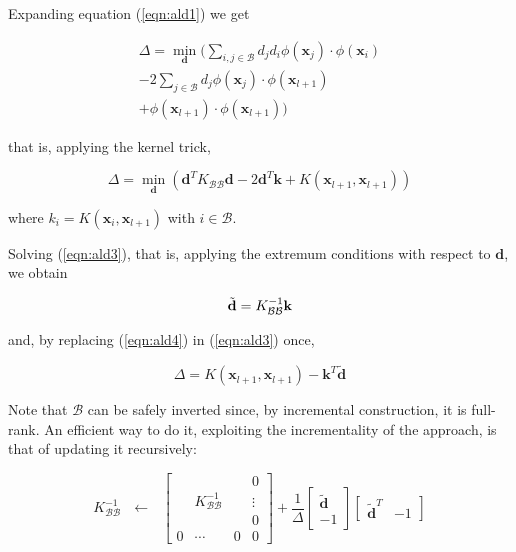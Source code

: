 \documentclass[10pt,twocolumn,letterpaper]{article}
\def\xx{\mathbf{x}}
\def\dd{\mathbf{d}}
\def\mdd{\tilde{\dd}}
\def\b{\mathcal{B}}
\begin{document}
Expanding equation (\ref{eqn:ald1}) we get

\begin{eqnarray} \label{eqn:ald2}
  \Delta = \min_{\dd} (
      \sum_{i,j \in \b} d_j d_i \phi(\xx_j) \cdot \phi(\xx_i) \\
    - 2\sum_{j \in \b} d_j \phi(\xx_j) \cdot \phi(\xx_{l+1}) \nonumber \\
    + \phi(\xx_{l+1}) \cdot \phi(\xx_{l+1}) ) \nonumber
\end{eqnarray}

that is, applying the kernel trick,

\begin{equation} \label{eqn:ald3}
  \Delta = \min_{\dd} \left(
      \dd^T K_{\b\b}\dd
    - 2 \dd^T \mathbf{k}
    + K(\xx_{l+1},\xx_{l+1})
  \right)
\end{equation}

where $k_i = K(\xx_i,\xx_{l+1})$ with $i \in \b$.

Solving (\ref{eqn:ald3}), that is, applying the extremum conditions
with respect to $\dd$, we obtain

\begin{equation} \label{eqn:ald4}
  \mdd = K_{\b\b}^{-1} \mathbf{k} \\
\end{equation}

and, by replacing (\ref{eqn:ald4}) in (\ref{eqn:ald3}) once,

\begin{equation} \label{eqn:ald5}
  \Delta = K(\xx_{l+1},\xx_{l+1}) - \mathbf{k}^T \mdd
\end{equation}

Note that $\b$ can be safely inverted since, by incremental
construction, it is full-rank. An efficient way to do it, exploiting
the incrementality of the approach, is that of updating it
recursively:

\begin{equation} \label{eqn:inv_upd}
  K_{\b\b}^{-1} ~~~ \leftarrow ~~~
  \left[\begin{array}{cccc}
       &               &   & 0 \\
       & K_{\b\b}^{-1} &   & \vdots \\
       &               &   & 0 \\
     0 &       \cdots  & 0 & 0
  \end{array}\right]
  +
  \frac{1}{\Delta}
  \left[\begin{array}{c}
    \mdd \\
    -1
  \end{array}\right]
  \left[\begin{array}{cc}
    \mdd^T & -1
  \end{array}\right]
\end{equation}
\end{document}
